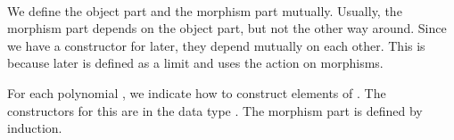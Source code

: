 {\begin{code}
\AgdaSpace{}%
\AgdaSymbol{(}\AgdaSpace{}%
\AgdaSpace{}%
\AgdaSymbol{)}\<%
\\
%
\>[2]\AgdaSpace{}%
\AgdaSymbol{:}\AgdaSpace{}%
\AgdaSymbol{\{}\AgdaSpace{}%
\AgdaSpace{}%
\AgdaSymbol{:}\AgdaSpace{}%
\AgdaSpace{}%
\AgdaSymbol{\}}\AgdaSpace{}%
\AgdaSpace{}%
\AgdaSpace{}%
\AgdaSpace{}%
\AgdaSpace{}%
\AgdaSpace{}%
\AgdaSpace{}%
\AgdaSpace{}%
\AgdaSymbol{(}\AgdaSpace{}%
\AgdaSpace{}%
\AgdaSymbol{)}\<%
\end{code}
}


We define the object part and the morphism part mutually.
Usually, the morphism part depends on the object part, but not the other way around.
Since we have a constructor for later, they depend mutually on each other.
This is because later is defined as a limit and uses the action on morphisms.

For each polynomial , we indicate how to construct elements of  .
The constructors for this are in the data type .
The morphism part  is defined by induction.

